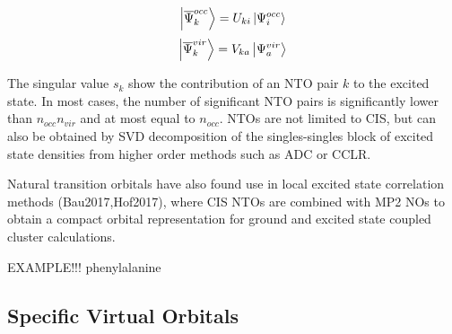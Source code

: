 \begin{equation}
\ket{\overline{\Psi}^{occ}_k} = U_{ki} \ket{\Psi^{occ}_i}
\end{equation}
\begin{equation}
\ket{\overline{\Psi}^{vir}_k} = V_{ka} \ket{\Psi^{vir}_a}
\end{equation}

\noindent The singular value $s_k$ show the contribution of an NTO pair $k$ to the excited state. In most cases, the number of significant NTO pairs is significantly lower than $n_{occ}n_{vir}$ and at most equal to $n_{occ}$. NTOs are not limited to CIS, but can also be obtained by SVD decomposition of the singles-singles block of excited state densities from higher order methods such as ADC or CCLR. 

Natural transition orbitals have also found use in local excited  state correlation methods (Bau2017,Hof2017), where CIS NTOs are combined with MP2 NOs to obtain a compact orbital representation for ground and excited state coupled cluster calculations.

EXAMPLE!!! phenylalanine







\subsection{Specific Virtual Orbitals}

